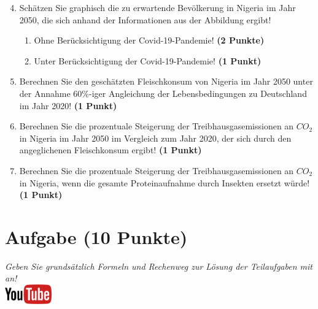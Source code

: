 \documentclass[a4paper, 9pt]{scrartcl}\usepackage[]{graphicx}\usepackage[]{xcolor}
\begin{document}
\begin{enumerate}
  \setcounter{enumi}{3}  
\item Sch{\"a}tzen Sie graphisch die zu erwartende Bev{\"o}lkerung in Nigeria im Jahr 2050, die sich
  anhand der Informationen aus der Abbildung ergibt!
\begin{enumerate}
\item Ohne Ber{\"u}cksichtigung der Covid-19-Pandemie! \textbf{(2
    Punkte)}
\item Unter Ber{\"u}cksichtigung der Covid-19-Pandemie! \textbf{(1
    Punkt)}
\end{enumerate}
\item Berechnen Sie den gesch{\"a}tzten Fleischkonsum von Nigeria im Jahr
  2050 unter der Annahme 60\%-iger Angleichung der Lebensbedingungen zu
  Deutschland im Jahr 2020! \textbf{(1 Punkt)}
\item Berechnen Sie die prozentuale Steigerung der Treibhausgasemissionen
  an $CO_2$ in Nigeria im Jahr 2050 im Vergleich zum Jahr 2020, der sich durch den
  angeglichenen Fleischkonsum ergibt! \textbf{(1
    Punkt)}
\item Berechnen Sie die prozentuale Steigerung der Treibhausgasemissionen
  an $CO_2$ in Nigeria, wenn die gesamte Proteinaufnahme 
  durch Insekten ersetzt w{\"u}rde! \textbf{(1
    Punkt)}
\end{enumerate}







 
\clearpage

\section{Aufgabe \hfill (10 Punkte)}

\textit{Geben Sie grunds{\"a}tzlich Formeln und Rechenweg zur L{\"o}sung der
  Teilaufgaben mit an!} \\[1Ex]

\hfill\href{https://youtu.be/8Pb2sKUIMyk}{\includegraphics[width =
  2cm]{img/youtube}} %
\hspace{2Ex}
\end{document}
